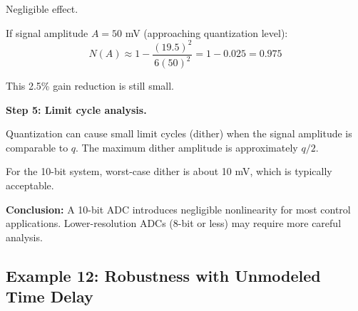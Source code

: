 \begin{example}
Negligible effect.

If signal amplitude $A = 50$ mV (approaching quantization level):
\begin{equation}
N(A) \approx 1 - \frac{(19.5)^2}{6(50)^2} = 1 - 0.025 = 0.975
\end{equation}

This 2.5\% gain reduction is still small.

\textbf{Step 5: Limit cycle analysis.}

Quantization can cause small limit cycles (dither) when the signal amplitude is comparable to $q$. The maximum dither amplitude is approximately $q/2$.

For the 10-bit system, worst-case dither is about 10 mV, which is typically acceptable.

\textbf{Conclusion:} A 10-bit ADC introduces negligible nonlinearity for most control applications. Lower-resolution ADCs (8-bit or less) may require more careful analysis.
\end{example}

\subsection{Example 12: Robustness with Unmodeled Time Delay}

